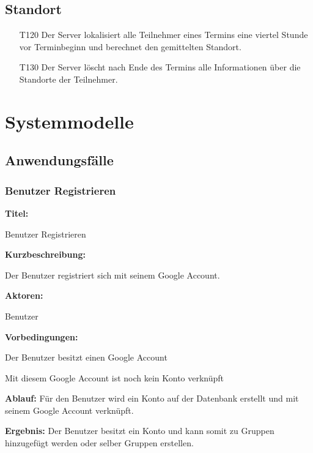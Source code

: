 \documentclass{scrartcl}
\begin{document}
	\subsection{Standort}
	\begin{itemize}
		\item[T120] Der Server lokalisiert alle Teilnehmer eines Termins eine viertel Stunde vor Terminbeginn und berechnet den gemittelten Standort. 
		\item[T130] Der Server löscht nach Ende des Termins alle Informationen über die Standorte der Teilnehmer. 
	 \end{itemize}	
	
	\newpage
	
	
	\section{Systemmodelle}
	
	\subsection{Anwendungsfälle}
	\subsubsection{Benutzer Registrieren}
	\begin{description}
		\item \textbf{Titel:}
		\begin{description}
			\item Benutzer Registrieren
		\end{description}
		\item \textbf{Kurzbeschreibung:}
		\begin{description}
			\item Der Benutzer registriert sich mit seinem Google Account.
		\end{description}
		\item \textbf{Aktoren:}
		\begin{description}
			\item Benutzer 
		\end{description}
		\item \textbf{Vorbedingungen:}
		\begin{description}
			\item Der Benutzer besitzt einen Google Account
			\item Mit diesem Google Account ist noch kein Konto verknüpft
		\end{description}
		\item \textbf{Ablauf:} \newline Für den Benutzer wird ein Konto auf der Datenbank erstellt und mit seinem Google Account verknüpft.
		\item \textbf{Ergebnis:} \newline Der Benutzer besitzt ein Konto und kann somit zu Gruppen hinzugefügt werden oder selber Gruppen erstellen.
	\end{description}
	
\end{document}
